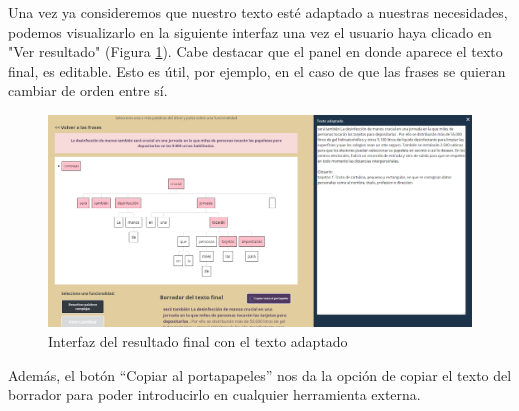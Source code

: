 Una vez ya consideremos que nuestro texto esté adaptado a nuestras necesidades, podemos visualizarlo en la siguiente interfaz una vez el usuario haya clicado en "Ver resultado" (Figura \ref{fig:resultadoFinal}). Cabe destacar que el panel en donde aparece el texto final, es editable. Esto es útil, por ejemplo, en el caso de que las frases se quieran cambiar de orden entre sí.
	 \begin{figure}[h!]
	\centering
	
	
	\includegraphics[scale=0.3]{Imagenes/Figuras/ResultadoFinal}
	
	
	\caption{Interfaz del resultado final con el texto adaptado}
	\label{fig:resultadoFinal}
\end{figure}


Además, el botón ``Copiar al portapapeles'' nos da la opción de copiar el texto del borrador para poder introducirlo en cualquier herramienta externa.


 